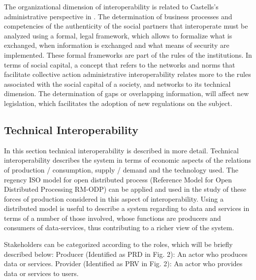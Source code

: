 \documentclass[10pt,twocolumn,ieeetran]{article}
\begin{document}
\begin{itemize}
The organizational dimension of interoperability is related to Castells's administrative perspective in \cite{Castells2}. The determination of business processes and competencies of the authenticity of the social partners that interoperate must be analyzed using a formal, legal framework, which allows to formalize what is exchanged, when information is exchanged and what means of security are implemented. These formal frameworks are part of the rules of the institutions. In terms of social capital, a concept that refers to the networks and norms that facilitate collective action \cite{Woolcock} \cite{Uphoff} \cite{Dahal} \cite{Sobel} \cite{Maseda} administrative interoperability relates more to the rules associated with the social capital of a society, and networks to its technical dimension. The determination of gaps or overlapping information, will affect new legislation, which facilitates the adoption of new regulations on the subject.

\end{itemize}

\subsection{Technical Interoperability}
In this section technical interoperability is described in more detail. Technical interoperability describes the system in terms of economic aspects of the relations of production / consumption, supply / demand and the technology used. The regency ISO model for open distributed process (Reference Model for Open Distributed Processing RM-ODP) can be applied and used in the study of these forces of production considered in this aspect of interoperability. Using a distributed model is useful to describe a system regarding to data and services in terms of a number of those involved, whose functions are producers and consumers of data-services, thus contributing to a richer view of the system.

Stakeholders can be categorized according to the roles, which will be briefly described below: Producer (Identified as PRD in Fig. 2): An actor who produces data or services. Provider (Identified as PRV in Fig. 2): An actor who provides data or services to users.
\end{document}
